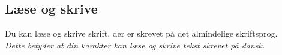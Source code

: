 \subsection*{Læse og skrive}
Du kan læse og skrive skrift, der er skrevet på det almindelige skriftsprog.\\
\textit{Dette betyder at din karakter kan læse og skrive tekst skrevet på dansk.}\\